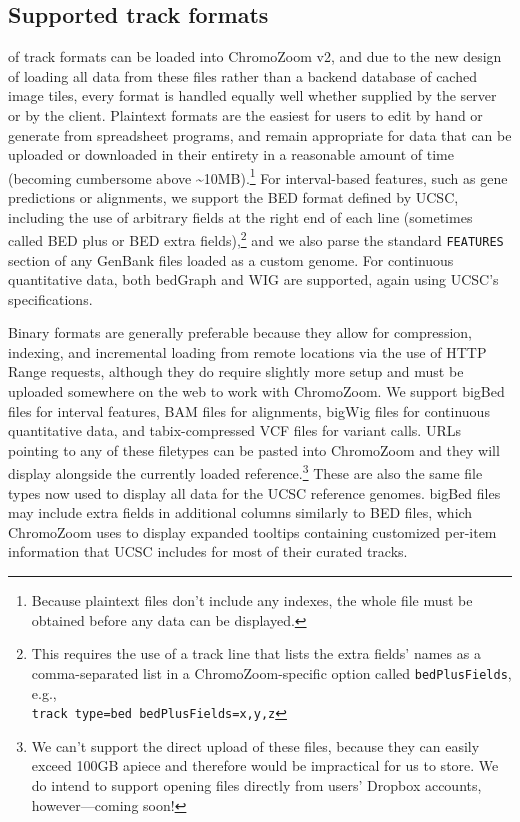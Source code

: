 \subsection{Supported track formats}

 of track formats can be loaded into ChromoZoom v2, and due to the new design of loading all data from these files rather than a backend database of cached image tiles, every format is handled equally well whether supplied by the server or by the client. Plaintext formats are the easiest for users to edit by hand or generate from spreadsheet programs, and remain appropriate for data that can be uploaded or downloaded in their entirety in a reasonable amount of time (becoming cumbersome above \textasciitilde{}10MB).\footnote{Because plaintext files don't include any indexes, the whole file must be obtained before any data can be displayed.} For interval-based features, such as gene predictions or alignments, we support the BED format defined by UCSC, including the use of arbitrary fields at the right end of each line (sometimes called BED plus or BED extra fields),\footnote{This requires the use of a track line that lists the extra fields' names as a comma-separated list in a ChromoZoom-specific option called \texttt{bedPlusFields}, e.g.,\\\texttt{track type=\textquotedbl{}bed\textquotedbl{} bedPlusFields=\textquotedbl{}x,y,z\textquotedbl}} and we also parse the standard \texttt{FEATURES} section of any GenBank files loaded as a custom genome. For continuous quantitative data, both bedGraph and WIG are supported, again using UCSC's specifications.

Binary formats are generally preferable because they allow for compression, indexing, and incremental loading from remote locations via the use of HTTP Range requests,\autocite{Li2009b,Li2011,Kent2010} although they do require slightly more setup and must be uploaded somewhere on the web to work with ChromoZoom. We support bigBed files for interval features, BAM files for alignments, bigWig files for continuous quantitative data, and tabix-compressed VCF files for variant calls. URLs pointing to any of these filetypes can be pasted into ChromoZoom and they will display alongside the currently loaded reference.\footnote{We can't support the direct upload of these files, because they can easily exceed 100GB apiece and therefore would be impractical for us to store. We do intend to support opening files directly from users' Dropbox accounts, however—coming soon!} These are also the same file types now used to display all data for the UCSC reference genomes. bigBed files may include extra fields in additional columns similarly to BED files, which ChromoZoom uses to display expanded tooltips containing customized per-item information that UCSC includes for most of their curated tracks.


